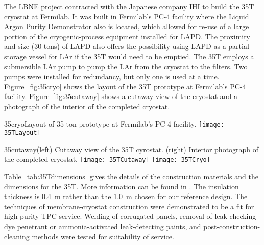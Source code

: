 The LBNE project contracted with the Japanese company IHI to build the 35T cryostat at Fermilab.  
It was built in Fermilab's PC-4 facility where the Liquid Argon Purity Demonstrator 
\cite{bib:lapdP07005}
also is located, which
allowed for re-use of a large portion of the cryogenic-process equipment installed for LAPD.
The proximity and size (30 tons) of LAPD also offers the possibility using LAPD as 
a partial storage vessel for LAr if the 35T would need to be emptied. The 35T employs a submersible LAr 
pump to pump the LAr from the cryostat to the filters. Two pumps were installed for redundancy, but 
only one is used at a time.
Figure~\ref{fig:35cryo} shows the layout of the 35T prototype at 
Fermilab's PC-4 facility. 
Figure~\ref{fig:35cutaway} shows a cutaway view of the cryostat and a photograph of the interior
of the completed cryostat. 

\begin{cdrfigure}{35cryo}{Layout of 35-ton prototype at Fermilab's PC-4 facility. }
\texttt{[image: 35TLayout]}
\end{cdrfigure}

\begin{cdrfigure}{35cutaway}{(left) Cutaway view of the 35T cyrostat. (right) Interior
photograph of the completed cryostat.}
\texttt{[image: 35TCutaway]}
\texttt{[image: 35TCryo]}
\end{cdrfigure}

Table~\ref{tab:35Tdimensions} gives the details of the construction materials and the
dimensions for the 35T.
More information can be found in
\cite{bib:membcryo1573}.
The insulation thickness is 0.4~m rather than the 1.0~m chosen for our reference design.  
The techniques of membrane-cryostat construction were demonstrated to be a fit 
for high-purity TPC service.
Welding of corrugated panels, removal of leak-checking dye penetrant or ammonia-activated
leak-detecting paints, and post-construction-cleaning methods were tested for suitability of service.  

